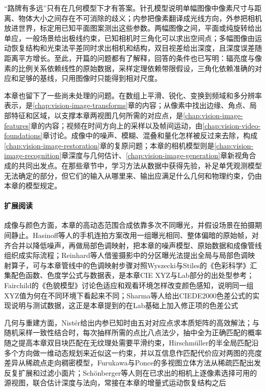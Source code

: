 “路牌有多远”只有在几何模型下才有答案。针孔模型说明单幅图像中像素尺寸与距离、物体大小之间存在不可消除的歧义；内参把像素翻译成光线方向，外参把相机放进世界，标定用已知平面图案测出这些参数。两幅图像之间，平面或纯旋转给出单应，一般场景给出极线约束，已知相机时三角化可以求出空间点；多幅图像由运动恢复结构和光束法平差同时求出相机和结构，双目视差给出深度，且深度误差随距离平方增长。至此，开篇的问题都有了解释，回答的条件也已写明：辐亮度与像素的比例关系依赖线性的原始数据，采样定理依赖带限假设，三角化依赖准确的对应和足够的基线，只用图像时只能得到相对尺度。

本章也留下了一些尚未处理的问题。在数组上平滑、锐化、变换到频域和多分辨率表示，是\ref{chap:vision-image-transforms}章的内容；从像素中找出边缘、角点、局部特征和区域，以支撑本章两视图几何所需的对应点，是\ref{chap:vision-image-features}章的内容；视频在时间方向上的采样以及帧间运动，由\ref{chap:vision-video-foundations}章讨论。成像中的噪声、模糊、混叠和量化怎样被反过来去除，构成\ref{chap:vision-image-restoration}章的复原问题；本章的相机模型则是\ref{chap:vision-image-recognition}章深度与几何估计、\ref{chap:vision-image-generation}章新视角合成的共同出发点。在那些章节中，学习方法从数据中获得先验，补足单凭观测模型无法确定的部分，但它们的输入从哪里来、输出应满足什么几何和物理约束，仍由本章的模型规定。

\paragraph{扩展阅读}
成像与颜色方面，本章的高动态范围合成依靠多次不同曝光，并假设场景在拍摄期间静止。Hasinoff等人的手机连拍方案改用一组曝光相同、整体偏暗的原始帧，对齐合并以降低噪声，再做局部色调映射，把本章的噪声模型、原始数据和成像管线组织成实际流程；Reinhard等人借鉴摄影中的分区曝光法提出全局与局部色调映射算子，可与本章管线中的色调映射步骤对照Wyszecki与Stiles的《色彩科学》汇集配色函数、色度学公式与数据表，是本章CIE XYZ与Lab部分的出处型参考；Fairchild的《色貌模型》讨论色适应和观看环境怎样改变颜色感知，说明同一组XYZ值为何在不同环境下看起来不同；Sharma等人给出CIEDE2000色差公式的实现说明与测试数据，这正是本章提到的在Lab基础上加入修正项的色差公式

几何与重建方面，Nistér给出内参已知时由五对对应点求本质矩阵的高效解法；与随机采样一致性结合时，每次抽样所需的点比八点法少，抽中全为正确匹配的概率随之提高本章双目块匹配在无纹理处需要平滑约束，Hirschmüller的半全局匹配沿多个方向做一维动态规划来近似这一约束，并以互信息作匹配代价应对两图的亮度差异从稀疏点走向稠密模型，Furukawa与Ponce的多视图立体方法从稀疏匹配出发反复扩展和过滤小面片；Schönberger等人则在已求出的相机上逐像素选择可用的源视图，联合估计深度与法向，常接在本章的增量式运动恢复结构之后

